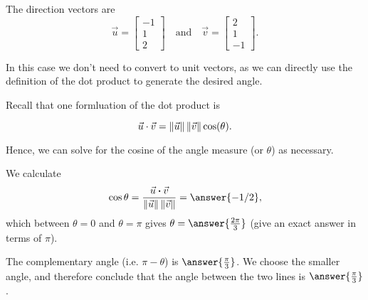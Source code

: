 \documentclass{ximera}
\begin{document}
\begin{solution}
  The direction vectors are
  \begin{equation*}
    \vec{u}=\begin{bmatrix} -1 \\ 1 \\ 2 \end{bmatrix}
    \quad\mbox{and}\quad
    \vec{v}=\begin{bmatrix} 2 \\ 1 \\ -1 \end{bmatrix}.
  \end{equation*}

  In this case we don't need to convert to unit vectors, as we can directly use the definition of the dot product to generate the desired angle. 
  
  Recall that one formluation of the dot product is 
  
  $$\vec{u}\cdot\vec{v}=\left\|\vec{u}\right\|\left\|\vec{v}\right\|\cos(\theta).$$
  
  Hence, we can solve for the cosine of the angle measure (or $\theta$) as necessary. 
  
  We calculate
  \begin{equation*}
    \cos\theta =
    \frac{\vec{u}\dotprod\vec{v}}{\norm{\vec{u}}\norm{\vec{v}}} = \answer{-1/2},
  \end{equation*}
  which between $\theta=0$ and $\theta=\pi$ gives $\theta=\answer{\frac{2\pi}{3}}$ (give an exact answer in terms of $\pi$).  
  
 The complementary angle (i.e. $\pi-\theta$) is $\answer{\frac{\pi}{3}}$. We
  choose the smaller angle, and therefore conclude that the angle
  between the two lines is $\answer{\frac{\pi}{3}}$.
\end{solution}
\end{document}
